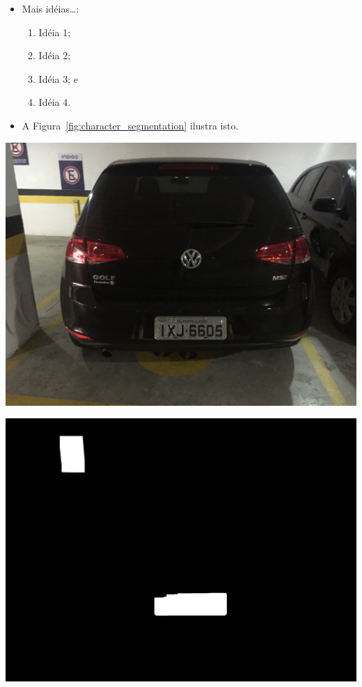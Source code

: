 \documentclass[a0,portrait]{a0poster}
\newcommand\itemadjust{\itemsep.5em \parskip0pt \parsep0pt}
\begin{document}
\begin{multicols}{2}
\vspace{13mm}


\begin{itemize}
	\item Mais idéias\dots:
	\begin{enumerate}
		[leftmargin=2em]\itemadjust
		\item Idéia 1;
		\item Idéia 2;
		\item Idéia 3; e
		\item Idéia 4.
	\end{enumerate}
	\item A Figura~\ref{fig:character_segmentation} ilustra isto.
\end{itemize}
\vspace{13mm}

\begin{center}
	\includegraphics[width=0.99\linewidth]{../../input/full_car.JPG}
	\label{fig:input_image}
\end{center}

\begin{center}
	\includegraphics[width=0.99\linewidth]{9fill_dilated.jpg}
	\label{fig:fill_dilated}
\end{center}


\end{multicols}
\end{document}
